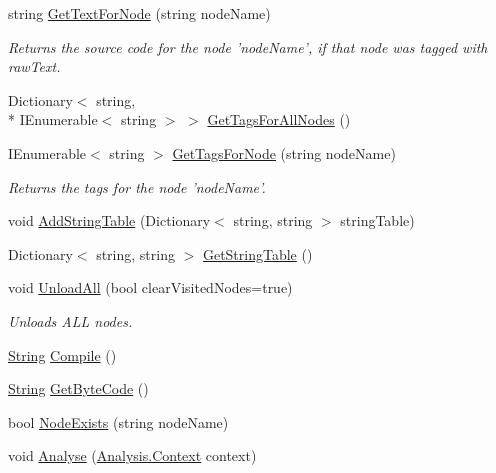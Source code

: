 \begin{DoxyCompactItemize}
\item 
string \hyperlink{a00090_a594641914a2b59cc5231645273d18e82}{Get\-Text\-For\-Node} (string node\-Name)
\begin{DoxyCompactList}\small\item\em Returns the source code for the node 'node\-Name', if that node was tagged with raw\-Text. \end{DoxyCompactList}\item 
Dictionary$<$ string, \\*
I\-Enumerable$<$ string $>$ $>$ \hyperlink{a00090_a20ef38a17e4a346de3b572b85052c1d1}{Get\-Tags\-For\-All\-Nodes} ()
\item 
I\-Enumerable$<$ string $>$ \hyperlink{a00090_ab85166316a6c5aadce336316406ed164}{Get\-Tags\-For\-Node} (string node\-Name)
\begin{DoxyCompactList}\small\item\em Returns the tags for the node 'node\-Name'. \end{DoxyCompactList}\item 
void \hyperlink{a00090_acfb8561e08dc85c6d9a855ad07d18783}{Add\-String\-Table} (Dictionary$<$ string, string $>$ string\-Table)
\item 
Dictionary$<$ string, string $>$ \hyperlink{a00090_af5fe57ebd11c41208070972f06a31b9d}{Get\-String\-Table} ()
\item 
void \hyperlink{a00090_a7acfe32f91b36ee812059f2ad3011133}{Unload\-All} (bool clear\-Visited\-Nodes=true)
\begin{DoxyCompactList}\small\item\em Unloads A\-L\-L nodes. \end{DoxyCompactList}\item 
\hyperlink{a00050_a301aa7c866593a5b625a8fc158bbeacea27118326006d3829667a400ad23d5d98}{String} \hyperlink{a00090_a7a8a3a461011172f5624da3a8ffa875f}{Compile} ()
\item 
\hyperlink{a00050_a301aa7c866593a5b625a8fc158bbeacea27118326006d3829667a400ad23d5d98}{String} \hyperlink{a00090_aade6c069db8f01572060d25a963d2a14}{Get\-Byte\-Code} ()
\item 
bool \hyperlink{a00090_a93bb76a1f9a4058f225ff4cee97483c6}{Node\-Exists} (string node\-Name)
\item 
void \hyperlink{a00090_a6b67b239f50c062160666e54592c433f}{Analyse} (\hyperlink{a00056}{Analysis.\-Context} context)
\end{DoxyCompactItemize}
